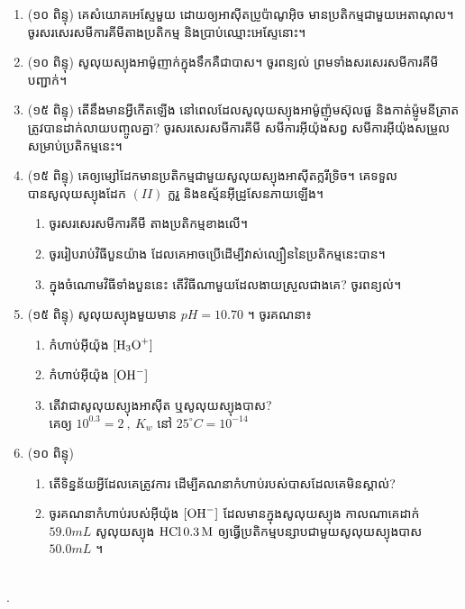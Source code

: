 \documentclass{officialexam}
\begin{document}
\begin{enumerate}[I]
	\item {\color{khtug}(១០ ពិន្ទុ)} គេសំយោគអេស្ទែមួយ ដោយឲ្យអាសុីតប្រូប៉ាណូអុិច មានប្រតិកម្មជាមួយអេតាណុល។\\
	ចូរសរសេរសមីការគីមីតាងប្រតិកម្ម និងប្រាប់ឈ្មោះអេស្ទែនោះ។
	\item {\color{khtug}(១០ ពិន្ទុ)} សូលុយស្យុងអាម៉ូញាក់ក្នុងទឹកគឺជាបាស។ ចូរពន្យល់ ព្រមទាំងសរសេរសមីការគីមីបញ្ជាក់។
	\item {\color{khtug}(១៥ ពិន្ទុ)} តើនឹងមានអ្វីកើតឡើង នៅពេលដែលសូលុយស្យុងអាម៉ូញ៉ូមស៊ុលផួ និងកាត់ម្ញ៉ូមនីត្រាតត្រូវបានដាក់លាយបញ្ចូលគ្នា? ចូរសរសេរសមីការគីមី សមីការអុីយ៉ុងសព្វ សមីការអុីយ៉ុងសម្រួលសម្រាប់ប្រតិកម្មនេះ។
	\item  {\color{khtug}(១៥ ពិន្ទុ)} គេឲ្យម្សៅដែកមានប្រតិកម្មជាមួយសូលុយស្យុងអាសុីតក្លរីទ្រិច។ គេទទួលបានសូលុយស្យុងដែក $(II)$ ក្លរួ និងឧស្ម័នអុីដ្រូសែនភាយឡើង។
	\begin{enumerate}[k]
		\item ចូរសរសេរសមីការគីមី តាងប្រតិកម្មខាងលើ។
		\item ចូររៀបរាប់វិធីបួនយ៉ាង ដែលគេអាចប្រើដើម្បីវាស់ល្បឿននៃប្រតិកម្មនេះបាន។
		\item ក្នុងចំណោមវិធីទាំងបួននេះ តើវិធីណាមួយដែលងាយស្រួលជាងគេ? ចូរពន្យល់។
	\end{enumerate}
	\item {\color{khtug}(១៥ ពិន្ទុ)} សូលុយស្យុងមួយមាន $pH=10.70$ ។ ចូរគណនា៖
	\begin{enumerate}[k,2]
		\item កំហាប់អុីយ៉ុង $\ce{[H3O^{+}]}$
		\item កំហាប់អុីយ៉ុង $\ce{[OH^{-}]}$
		\item តើវាជាសូលុយស្យុងអាសុីត ឬសូលុយស្យុងបាស?\\
		គេឲ្យ $10^{0.3}=2~,~K_w$ នៅ $25^\circ C=10^{-14}$
	\end{enumerate}
	\item {\color{khtug}(១០ ពិន្ទុ)} \begin{enumerate}[k]
		\item តើទិន្នន័យអ្វីដែលគេត្រូវការ ដើម្បីគណនាកំហាប់របស់បាសដែលគេមិនស្គាល់?
		\item ចូរគណនាកំហាប់របស់អុីយ៉ុង $\ce{[OH^{-}]}$ ដែលមានក្នុងសូលុយស្យុង កាលណាគេដាក់ $59.0mL$ សូលុយស្យុង $\ce{HCl 0.3M}$ ឲ្យធ្វើប្រតិកម្មបន្សាបជាមួយសូលុយស្យុងបាស $50.0mL$ ។ 
	\end{enumerate}
\end{enumerate}
\\
{\color{white}.}\dotfill\\
\end{document}
